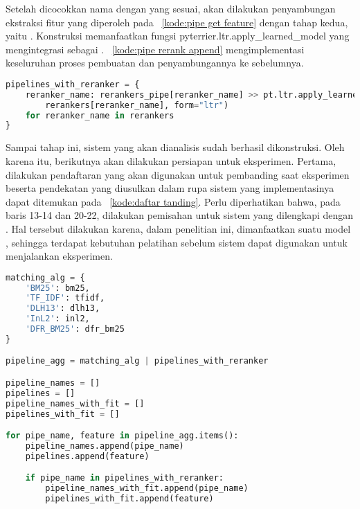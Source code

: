 Setelah dicocokkan nama dengan \pipeline{} yang sesuai, akan dilakukan penyambungan \pipeline{} ekstraksi fitur yang diperoleh pada \kode{}~\ref{kode:pipe get feature} dengan \pipeline{} tahap \ranking{} kedua, yaitu \pipeline{} \reranker{}. Konstruksi \pipeline{} \reranker{} memanfaatkan fungsi pyterrier.ltr.apply\_learned\_model yang mengintegrasi \lambdamart{} sebagai \pipeline{}. \kode{}~\ref{kode:pipe rerank append} mengimplementasi keseluruhan proses pembuatan \pipeline{} \reranker{} dan penyambungannya ke \pipeline{} sebelumnya.
\begin{lstlisting}[language=Python, caption={Pembuatan dan penyambungan \pipeline{} \reranker{}}, label={kode:pipe rerank append}]
pipelines_with_reranker = {
    reranker_name: rerankers_pipe[reranker_name] >> pt.ltr.apply_learned_model(
        rerankers[reranker_name], form="ltr")
    for reranker_name in rerankers
}\end{lstlisting}

Sampai tahap ini, sistem \ir{} yang akan dianalisis sudah berhasil dikonstruksi. Oleh karena itu, berikutnya akan dilakukan persiapan untuk eksperimen. Pertama, dilakukan pendaftaran \base{} \retriever{} yang akan digunakan untuk pembanding saat eksperimen beserta pendekatan yang diusulkan dalam rupa sistem \ir{} yang implementasinya dapat ditemukan pada \kode{}~\ref{kode:daftar tanding}. Perlu diperhatikan bahwa, pada baris 13-14 dan 20-22, dilakukan pemisahan untuk sistem yang dilengkapi dengan \reranker{}. Hal tersebut dilakukan karena, dalam penelitian ini, dimanfaatkan suatu model \ml{}, sehingga terdapat kebutuhan pelatihan sebelum sistem dapat digunakan untuk menjalankan eksperimen.
\begin{lstlisting}[language=Python, caption={Pendaftaran model untuk eksperimen}, label={kode:daftar tanding}]
matching_alg = {
    'BM25': bm25,
    'TF_IDF': tfidf,
    'DLH13': dlh13,
    'InL2': inl2,
    'DFR_BM25': dfr_bm25
}

pipeline_agg = matching_alg | pipelines_with_reranker

pipeline_names = []
pipelines = []
pipeline_names_with_fit = []
pipelines_with_fit = []

for pipe_name, feature in pipeline_agg.items():
    pipeline_names.append(pipe_name)
    pipelines.append(feature)

    if pipe_name in pipelines_with_reranker:
        pipeline_names_with_fit.append(pipe_name)
        pipelines_with_fit.append(feature)
\end{lstlisting}

